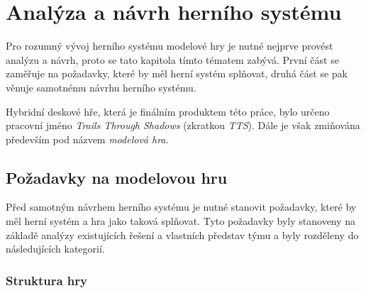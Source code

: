 \chapter{Analýza a návrh herního systému}
\label{chap:design_analysis}

Pro rozumný vývoj herního systému modelové hry je nutné nejprve provést analýzu a návrh, proto se tato kapitola tímto tématem zabývá. První část se zaměřuje na požadavky, které by měl herní systém splňovat, druhá část se pak věnuje samotnému návrhu herního systému.

Hybridní deskové hře, která je finálním produktem této práce, bylo určeno pracovní jméno \textit{Trails Through Shadows} (zkratkou \textit{TTS}). Dále je však zmiňována především pod názvem \textit{modelová hra}.



\section{Požadavky na modelovou hru}
\label{sec:requirements}

Před samotným návrhem herního systému je nutné stanovit požadavky, které by měl herní systém a hra jako taková splňovat. Tyto požadavky byly stanoveny na základě analýzy existujících řešení  a vlastních představ týmu a byly rozděleny do následujících kategorií.

\subsection{Struktura hry}
\label{subsec:req_structure}

